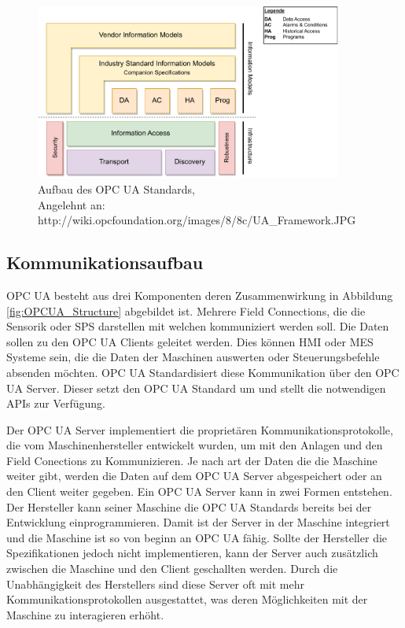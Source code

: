 \documentclass[a4paper, 12pt, oneside]{scrbook}
\begin{document}
		\begin{figure}[h]
			\centering
			\includegraphics[width=0.9\textwidth]{res/diagramms/companionSpezifikations.pdf}
			\caption{Aufbau des OPC UA Standards, \\ Angelehnt an: http://wiki.opcfoundation.org/images/8/8c/UA\_Framework.JPG} %
			\label{fig:OPCUA_Framework}
		\end{figure}
	
		\subsection{Kommunikationsaufbau} %
		
		OPC UA besteht aus drei Komponenten deren Zusammenwirkung in Abbildung \ref{fig:OPCUA_Structure} abgebildet ist. Mehrere Field Connections, die die Sensorik oder SPS darstellen mit welchen kommuniziert werden soll. Die Daten sollen zu den OPC UA Clients geleitet werden. Dies können \ac{HMI} oder MES Systeme sein, die die Daten der Maschinen auswerten oder Steuerungsbefehle absenden möchten. OPC UA Standardisiert diese Kommunikation über den OPC UA Server. Dieser setzt den OPC UA Standard um und stellt die notwendigen APIs zur Verfügung.
				
		Der OPC UA Server implementiert die proprietären Kommunikationsprotokolle, die vom Maschinenhersteller entwickelt wurden, um mit den Anlagen und den Field Conections zu Kommunizieren. Je nach art der Daten die die Maschine weiter gibt, werden die Daten auf dem OPC UA Server abgespeichert oder an den Client weiter gegeben. Ein OPC UA Server kann in zwei Formen entstehen. Der Hersteller kann seiner Maschine die OPC UA Standards bereits bei der Entwicklung einprogrammieren. Damit ist der Server in der Maschine integriert und die Maschine ist so von beginn an OPC UA fähig. Sollte der Hersteller die Spezifikationen jedoch nicht implementieren, kann der Server auch zusätzlich zwischen die Maschine und den Client geschallten werden. Durch die Unabhängigkeit des Herstellers sind diese Server oft mit mehr Kommunikationsprotokollen ausgestattet, was deren Möglichkeiten mit der Maschine zu interagieren erhöht. 
		
\end{document}
